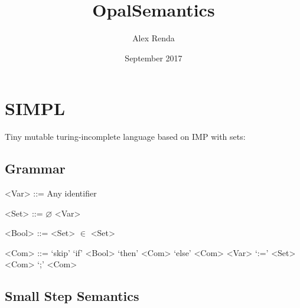 \documentclass{article}
\title{OpalSemantics}
\author{Alex Renda}
\date{September 2017}
\begin{document}
\maketitle

\section{SIMPL}

Tiny mutable turing-incomplete language based on IMP with sets:

\subsection{Grammar}

\begin{grammar}
<Var> ::= Any identifier

<Set> ::= $\varnothing$
\alt <Var>

<Bool> ::= <Set> $\in$ <Set>

<Com> ::= `skip'
\alt `if' <Bool> `then' <Com> `else' <Com>
\alt <Var> `:=' <Set>
\alt <Com> `;' <Com>

\end{grammar}

\subsection{Small Step Semantics}
\end{document}
